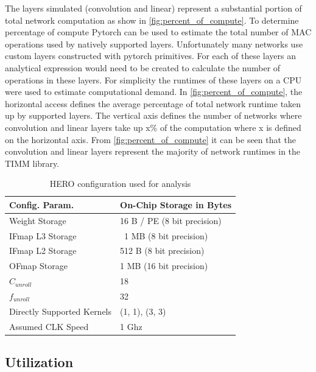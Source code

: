 The layers simulated (convolution and linear) represent a substantial portion of
total network computation as show in \autoref{fig:percent_of_compute}. 
To determine percentage of compute Pytorch can be used to estimate the
total number of MAC operations used by natively supported layers. Unfortunately
many networks use custom layers constructed with pytorch primitives. For
each of these layers an analytical expression would need to be created to calculate
the number of operations in these layers. For simplicity the runtimes
of these layers on a CPU were used to estimate computational demand. In
\autoref{fig:percent_of_compute}, the horizontal access defines the average
percentage of total network runtime taken up by supported layers. The vertical
axis defines the number of networks where convolution and linear layers take up
x\% of the computation where x is defined on the horizontal axis. From
\autoref{fig:percent_of_compute} it can be seen that the convolution and linear
layers represent the majority of network runtimes in the TIMM library. 

\begin{table}[]
    \center
    \begin{tabular}{|l|l|}
    \toprule
    Config. Param. & On-Chip Storage in Bytes    \\ 
    \midrule
    Weight Storage            & 16 B / PE (8 bit precision)  \\ \hline
    IFmap L3 Storage          & ~1 MB (8 bit precision)   \\ \hline
    IFmap L2 Storage          & 512 B (8 bit precision)   \\ \hline
    OFmap Storage             & 1 MB (16 bit precision)   \\ \hline
    $C_{unroll}$              & 18   \\ \hline
    $f_{unroll}$              & 32   \\ \hline
    Directly Supported Kernels             & {(1, 1), (3, 3)}   \\ \hline
    Assumed CLK Speed             & 1 Ghz   \\ \hline
\end{tabular}
\caption{HERO configuration used for analysis}
\label{tab:hero_config}
\end{table}

\subsection{Utilization}
\label{chap:hero:results:utilization}


